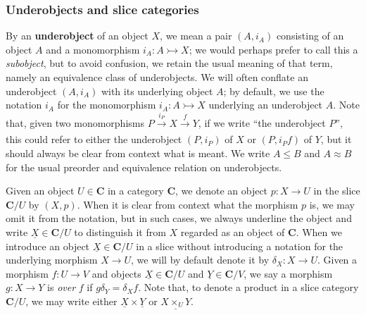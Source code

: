 \documentclass{amsart}
\newcommand\bC{\mathbf{C}}
\newcommand\defword[1]{{\boldmath \textbf{#1}}}
\newcommand\tox[2][]{\xrightarrow[#1]{#2}}
\newcommand\tto{\rightarrowtail}
\newcommand\und[1]{\underline{#1}}
\theoremstyle{definition}
\theoremstyle{remark}
\theoremstyle{plainwithref}
\begin{document}
\subsubsection{Underobjects and slice categories} \label{subsubsec:under-slice-prelims}
By an \defword{underobject} of an object \( X \), we mean a pair \( (A, i_A) \) consisting of an object \( A \) and a monomorphism \( i_A \colon A \tto X \); we would perhaps prefer to call this a \emph{subobject}, but to avoid confusion, we retain the usual meaning of that term, namely an equivalence class of underobjects.
We will often conflate an underobject \( (A, i_A) \) with its underlying object \( A \); by default, we use the notation \( i_A \) for the monomorphism \( i_A \colon A \tto X \) underlying an underobject \( A \).
Note that, given two monomorphisms \( P \tox{i_P} X \tox{f} Y \), if we write ``the underobject \( P \)'', this could refer to either the underobject \( (P, i_P) \) of \( X \) or \( (P, i_P f) \) of \( Y \), but it should always be clear from context what is meant.
We write \( A \le B \) and \( A \approx B \) for the usual preorder and equivalence relation on underobjects.

Given an object \( U \in \bC \) in a category \( \bC \), we denote an object \( p \colon X \to U \) in the slice \( \bC / U \) by \( (X, p) \).
When it is clear from context what the morphism \( p \) is, we may omit it from the notation, but in such cases, we always underline the object and write \( \und X \in \bC / U \) to distinguish it from \( X \) regarded as an object of \( \bC \).
When we introduce an object \( \und X \in \bC / U \) in a slice without introducing a notation for the underlying morphism \( X \to U \), we will by default denote it by \( \delta_X \colon X \to U \).
Given a morphism \( f \colon U \to V \) and objects \( \und X \in \bC / U \) and \( \und Y \in \bC / V \), we say a morphism \( g \colon X \to Y \) is \emph{over} \( f \) if \( g \delta_Y = \delta_X f \).
Note that, to denote a product in a slice category \( \bC / U \), we may write either \( \und X \times \und Y \) or \( \und{X \times_U Y} \).
\end{document}
